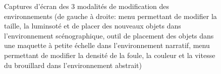 \begin{figure}[h]
  \caption{Captures d'écran des 3 modalités de modification des environnements (de gauche à droite: menu permettant de modifier la taille, la luminsoté et de placer des nouveaux objets dans l'environnement scénographique, outil de placement des objets dans une maquette à petite échelle dans l'environnement narratif, menu permettant de modifier la densité de la foule, la couleur et la vitesse du brouillard dans l'environnement abstrait)}
  \label{fig:trois_images}
\end{figure}


